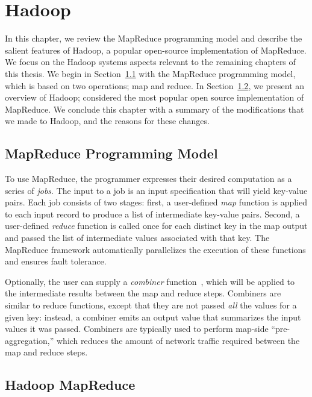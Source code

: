 \chapter[MapReduce: From an Elephant's Perspective]{Hadoop}
\label{ch:hadoop}

In this chapter, we review the MapReduce programming model and describe the
salient features of Hadoop, a popular open-source implementation of MapReduce.
We focus on the Hadoop systems aspects relevant to the remaining chapters of
this thesis.  We begin in Section~\ref{ch:hadoop:sec:progmodel} with the
MapReduce programming model, which is based on two operations; map and reduce.
In Section~\ref{ch:hadoop:sec:hadoop}, we present an overview of Hadoop;
considered the most popular open source implementation of MapReduce.  We
conclude this chapter with a summary of the modifications that we made to
Hadoop, and the reasons for these changes.

\section{MapReduce Programming Model}
\label{ch:hadoop:sec:progmodel}

To use MapReduce, the programmer expresses their desired computation as a
series of \emph{jobs}.  The input to a job is an input specification that will
yield key-value pairs.  Each job consists of two stages: first, a user-defined
\emph{map} function is applied to each input record to produce a list of
intermediate key-value pairs.  Second, a user-defined \emph{reduce} function is
called once for each distinct key in the map output and passed the list of
intermediate values associated with that key.  The MapReduce framework
automatically parallelizes the execution of these functions and ensures fault
tolerance.

Optionally, the user can supply a \emph{combiner}
function~\cite{mapreduce-osdi}, which will be applied to the intermediate results
between the map and reduce steps.  Combiners are similar to reduce functions,
except that they are not passed \emph{all} the values for a given key: instead,
a combiner emits an output value that summarizes the input values it was
passed.  Combiners are typically used to perform map-side ``pre-aggregation,''
which reduces the amount of network traffic required between the map and reduce
steps.

\section{Hadoop MapReduce}
\label{ch:hadoop:sec:hadoop}

